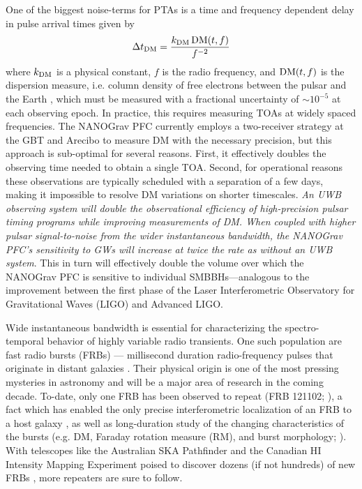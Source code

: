 \documentclass[10pt]{myNSF}
\begin{document}
One of the biggest noise-terms for PTAs is a time and frequency
dependent delay in pulse arrival times given by
\begin{equation}
  \Delta t_{\rm DM} = \frac{k_{\rm DM} \, \textrm{DM}(t,f)}{f^{-2}}
\end{equation}
where $k_{\rm DM}$ is a physical constant, $f$ is the radio frequency,
and $\textrm{DM}(t,f)$ is the dispersion measure, i.e. column density of free
electrons between the pulsar and the Earth \citep[e.g.][]{lk12}, which
must be measured with a fractional uncertainty of $\sim 10^{-5}$ at
each observing epoch.  In practice, this requires measuring TOAs at
widely spaced frequencies.  The NANOGrav PFC currently employs a
two-receiver strategy at the GBT and Arecibo to measure DM with the
necessary precision, but this approach is sub-optimal for several
reasons.  First, it effectively doubles the observing time needed to
obtain a single TOA.  Second, for operational reasons these
observations are typically scheduled with a separation of a few days,
making it impossible to resolve DM variations on shorter timescales.
\emph{An UWB observing system will double the observational efficiency
  of high-precision pulsar timing programs while improving
  measurements of DM.  When coupled with higher pulsar signal-to-noise
  from the wider instantaneous bandwidth, the NANOGrav PFC's
  sensitivity to GWs will increase at twice the rate as without an UWB
  system}.  This in turn will effectively double the volume over which
the NANOGrav PFC is sensitive to individual SMBBHs---analogous to the
improvement between the first phase of the Laser Interferometric
Observatory for Gravitational Waves (LIGO) and Advanced LIGO.

 Wide instantaneous bandwidth is
essential for characterizing the spectro-temporal behavior of highly
variable radio transients.  One such population are fast radio bursts
(FRBs) --- millisecond duration radio-frequency pulses that originate
in distant galaxies \citep{lbm+07,tsb+13}.  Their physical origin is
one of the most pressing mysteries in astronomy and will be a major
area of research in the coming decade.  To-date, only one FRB has been
observed to repeat (FRB 121102; \cite{sch+14,ssh+16a}), a fact which
has enabled the only precise interferometric localization of an FRB to
a host galaxy \citep{clw+17,tbc+17}, as well as long-duration study of
the changing characteristics of the bursts (e.g. DM, Faraday rotation
measure (RM), and burst morphology; \cite{msh+18}).  With telescopes
like the Australian SKA Pathfinder and the Canadian H{\sc I} Intensity
Mapping Experiment poised to discover dozens (if not hundreds) of new
FRBs \citep{smb+18,chime18}, more repeaters are sure to follow.
\end{document}
